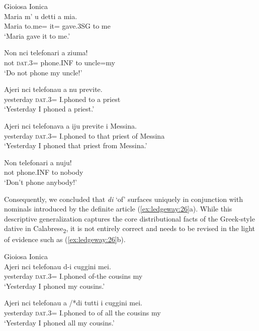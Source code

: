 \documentclass[output=paper,modfonts,nonflat]{langsci/langscibook}
\begin{document}
\ea\label{ex:ledgeway:25}
  Gioiosa Ionica\\
\ea
	\gll Maria  m’  u  detti  a  mia.\\
    Maria  to.me=  it=  gave.3SG   to  me\\
    \glt `Maria gave it to me.'

\ex
	\gll Non  nci  telefonari  a  ziuma!\\
      not  \textsc{dat}.3=  phone.INF   to  uncle=my\\
      \glt `Do not phone my uncle!'

\ex
	\gll Ajeri  nci  telefonau  a   nu   previte.\\
      yesterday  \textsc{dat}.3=  I.phoned    to   a    priest \\
      \glt `Yesterday I phoned a priest.'

\ex
	\gll Ajeri  nci   telefonava  a  iju    previte   i   Messina.\\
      yesterday  \textsc{dat}.3=  I.phoned  to  that   priest   of   Messina\\
      \glt `Yesterday I phoned that priest from Messina.'

\ex
	\gll Non  telefonari  a  nuju!\\
    not  phone.INF   to  nobody\\
    \glt `Don’t phone anybody!'
    \z
    \z

Consequently, we concluded that \textit{di} ‘of’ surfaces uniquely in conjunction with nominals introduced by the definite article (\ref{ex:ledgeway:26}a). While this descriptive generalization captures the core distributional facts of the Greek-style dative in Calabrese\textsubscript{2}, it is not entirely correct and needs to be revised in the light of evidence such as (\ref{ex:ledgeway:26}b).

\ea\label{ex:ledgeway:26}
  Gioiosa Ionica\\
\ea
	\gll Ajeri  nci  telefonau  d-i     cuggini   mei.\\
      yesterday  \textsc{dat}.3=  I.phoned  of-the  cousins   my\\
      \glt `Yesterday I phoned my cousins.'

\ex
	\gll Ajeri  nci  telefonau  a /*di  tutti   i     cuggini   mei.\\
      yesterday  \textsc{dat}.3=  I.phoned  to   of  all   the   cousins   my\\
      \glt `Yesterday I phoned all my cousins.'
      \z
      \z
\end{document}
